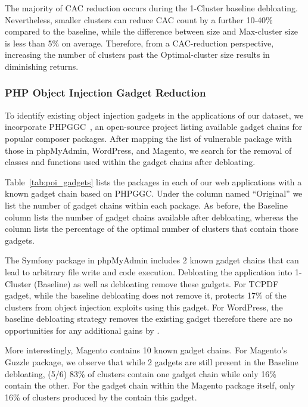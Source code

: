 The majority of CAC reduction occurs during the 1-Cluster baseline debloating. 
Nevertheless, smaller clusters can reduce CAC count by a further 10-40\% compared to the baseline, while the difference between \sys{} size and Max-cluster size is less than 5\% on average.
Therefore, from a CAC-reduction perspective, increasing the number of clusters past the Optimal-cluster size results in diminishing returns.

\subsubsection{PHP Object Injection Gadget Reduction}

To identify existing object injection gadgets in the applications of our dataset, we incorporate PHPGGC~\cite{PHPGGC}, an open-source project listing available gadget chains for popular composer packages. 
After mapping the list of vulnerable package with those in phpMyAdmin, WordPress, and Magento, we search for the removal of classes and functions used within the gadget chains after debloating. 

Table~\ref{tab:poi_gadgets} lists the packages in each of our web applications with a known gadget chain based on PHPGGC. 
Under the column named ``Original'' we list the number of gadget chains within each package. 
As before, the Baseline column lists the number of gadget chains available after debloating, whereas the \sys{} column lists the percentage of the optimal number of clusters that contain those gadgets. 

The Symfony package in phpMyAdmin includes 2 known gadget chains that can lead to arbitrary file write and code execution. 
Debloating the application into 1-Cluster (Baseline) as well as \sys{} debloating remove these gadgets. 
For TCPDF gadget, while the baseline debloating does not remove it, \sys{} protects 17\% of the clusters from object injection exploits using this gadget. 
For WordPress, the baseline debloating strategy removes the existing gadget therefore there are no opportunities for any additional gains by \sys{}.

More interestingly, Magento contains 10 known gadget chains. 
For Magento's Guzzle package, we observe that while 2 gadgets are still present in the Baseline debloating, (5/6) 83\% of clusters contain one gadget chain while only 16\% contain the other. 
For the gadget chain within the Magento package itself, only 16\% of clusters produced by the \sys{} contain this gadget. 

